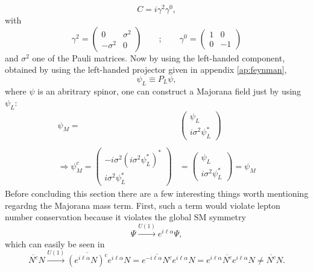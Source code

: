 \begin{equation}
	C=i\gamma^2\gamma^0,
\end{equation}
with
\begin{equation*}
\gamma^2=\left(\begin{array}{cc}0&\sigma^2\\-\sigma^2&0\end{array}\right)\qquad	;\qquad \gamma^0=\left(\begin{array}{cc}1&0\\0&-1\end{array}\right)
\end{equation*}
and $\sigma^2$ one of the Pauli matrices. Now by using the left-handed component, obtained by using the left-handed projector given in appendix \ref{ap:feynman}, 
\begin{equation}
	\psi_L\equiv P_L\psi,
\end{equation}
where $\psi$ is an abritrary spinor, one can construct a Majorana field just by using $\psi_L$:
\begin{align*}
	\psi_M=&\left(\begin{array}{c}\psi_L\\i\sigma^2\psi_L^*\end{array}\right)\\\\
	\Rightarrow \psi_M^c=\left(\begin{array}{c}-i\sigma^2(i\sigma^2\psi_L^*)^*\\i\sigma^2\psi_L^*\end{array}\right)&=\left(\begin{array}{c}\psi_L\\i\sigma^2\psi_L^*\end{array}\right)=\psi_M
\end{align*}
\newline \indent
Before concluding this section there are a few interesting things worth mentioning regardng the Majorana mass term. 
First, such a term would violate lepton number conservation because it violates the global SM symmetry 
\begin{equation}
\Psi\overset{U(1)}{\longrightarrow}e^{i\ell\alpha}\Psi,
\end{equation}
which can easily be seen in
\begin{equation*}
\overline{N^c}N \overset{U(1)}{\longrightarrow}\overline{(e^{i \ell \alpha}N)^c}e^{i \ell\alpha}N=\overline{e^{-i \ell\alpha}N^c}e^{i \ell \alpha}N=e^{i \ell \alpha}\overline{N^c}e^{i \ell\alpha}N\neq	\overline{N^c}N.
\end{equation*}
